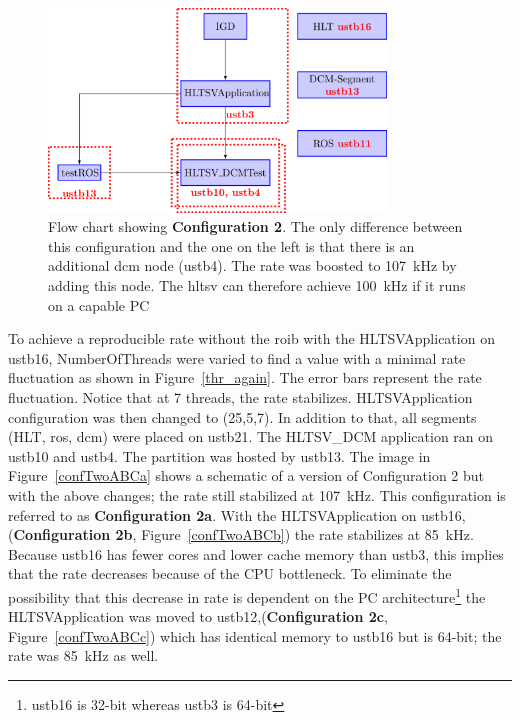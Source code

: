 \begin{figure}[!h]
\centering
  \includegraphics[width=0.8\textwidth]{figures/confTwo.png}
  \caption{Flow chart showing {\bf Configuration 2}. The only difference between this configuration and the one on 
the left is that there is an additional \acrshort{dcm} node (ustb4). The rate was boosted 
to 107\ kHz by adding this node. The \acrshort{hltsv} can therefore achieve 100\ kHz if it runs on a capable PC}
  \label{conf2B}
\end{figure}


\par To achieve a reproducible rate without the \acrshort{roib} with 
the HLTSVApplication on ustb16, NumberOfThreads were varied to find a value with 
a minimal rate fluctuation as shown in Figure~\ref{thr_again}. 
The error bars represent the rate fluctuation. Notice that at 7 threads, 
the rate stabilizes. HLTSVApplication configuration was then changed to (25,5,7). 
In addition to that, all segments (HLT, \acrshort{ros}, \acrshort{dcm}) were placed on ustb21. The 
HLTSV\_DCM application ran on ustb10 and ustb4. The partition was hosted by ustb13. The 
image in Figure~\ref{confTwoABCa} shows a schematic of a version of 
Configuration 2 but with the above changes; the rate still stabilized at 107\ kHz.  
This configuration is referred to as {\bf Configuration 2a}.  With the HLTSVApplication on ustb16,({\bf Configuration 2b}, 
Figure~\ref{confTwoABCb}) the rate stabilizes at 85\ kHz. Because ustb16 has 
fewer cores and lower cache memory than ustb3, this implies that the rate decreases because of the 
CPU bottleneck. To eliminate the possibility that this decrease in rate is dependent on the PC 
architecture\footnote{ustb16 is 32-bit whereas ustb3 is 64-bit} the HLTSVApplication was moved to 
ustb12,({\bf Configuration 2c}, Figure~\ref{confTwoABCc}) which has identical memory 
to ustb16 but is 64-bit; the rate was 85\ kHz as well. 

